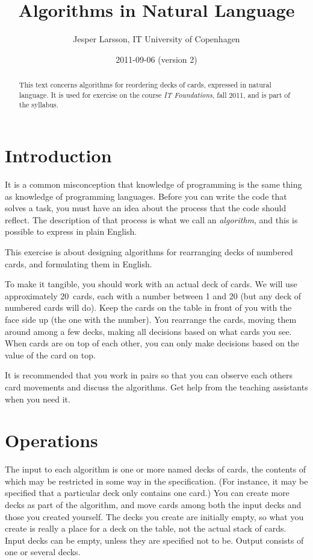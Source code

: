 \documentclass[a4paper,twoside]{tufte-handout}
\title{Algorithms in Natural Language}
\author{Jesper Larsson, IT University of Copenhagen}
\date{2011-09-06 (version 2)}
\begin{document}
\maketitle

\begin{abstract}
  This text concerns algorithms for reordering decks of cards,
  expressed in natural language. It is used for exercise on the course
  \emph{IT Foundations}, fall 2011, and is part of the syllabus.
\end{abstract}

\section{Introduction}\label{sec-intro}

It is a common misconception that knowledge of programming is the same
thing as knowledge of programming languages. Before you can write the
code that solves a task, you must have an idea about the process that
the code should reflect. The description of that process is what we
call an \emph{algorithm}, and this is possible to express in plain
English.

This exercise is about designing algorithms for rearranging decks of
numbered cards, and formulating them in English.

To make it tangible, you should work with an actual deck of
cards. We will use approximately 20~cards, each with a number between
1 and 20 (but any deck of numbered cards will do). Keep the cards on
the table in front of you with the face side up (the one with the
number). You rearrange the cards, moving them around among a
few decks, making all decisions based on what cards you see. When
cards are on top of each other, you can only make decisions based on
the value of the card on top.

It is recommended that you work in pairs so that you can observe each
others card movements and discuss the algorithms. Get help from the
teaching assistants when you need it.

\section{Operations}\label{sec-ops}

The input to each algorithm is one or more named decks of cards, the
contents of which may be restricted in some way in the
specification. (For instance, it may be specified that a particular
deck only contains one card.) You can create more decks as part of the
algorithm, and move cards among both the input decks and those you
created yourself. The decks you create are initially empty, so what
you create is really a place for a deck on the table, not the actual
stack of cards. Input decks can be empty, unless they are specified
not to be. Output consists of one or several decks.
\end{document}
